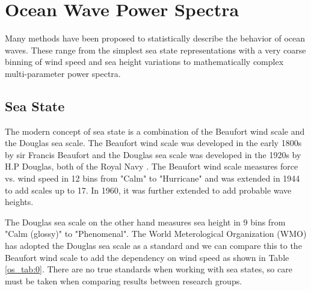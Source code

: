 \section{Ocean Wave Power Spectra}  \label{os_sec:power_spectra}
Many methods have been proposed to statistically describe the behavior of ocean waves. These range from the simplest sea state representations with a very coarse binning of wind speed and sea height variations to mathematically complex multi-parameter power spectra.

\subsection {Sea State}
The modern concept of sea state is a combination of the Beaufort wind scale and the Douglas sea scale. The Beaufort wind scale was developed in the early 1800s by sir Francis Beaufort and the Douglas sea scale was developed in the 1920s by H.P Douglas, both of the Royal Navy \cite{uk_met_fact_sheet6}. The Beaufort wind scale measures force vs. wind speed in 12 bins from "Calm" to "Hurricane" and was extended in 1944 to add scales up to 17. In 1960, it was further extended to add probable wave heights. 

The Douglas sea scale on the other hand measures sea height in 9 bins from "Calm (glossy)" to "Phenomenal". The World Meterological Organization (WMO) has adopted the Douglas sea scale as a standard \cite{wmo_code} and we can compare this to the Beaufort wind scale to add the dependency on wind speed as shown in Table \ref{os_tab:0}. There are no true standards when working with sea states, so care must be taken when comparing results between research groups.


